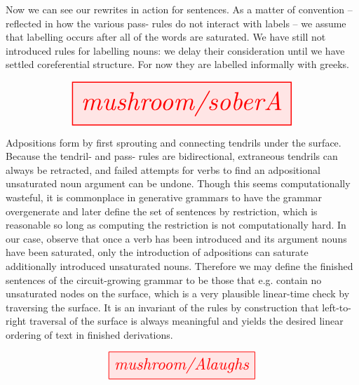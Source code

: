 \begin{myboxR}
\begin{example}\label{ex:soberA}
Now we can see our rewrites in action for sentences. As a matter of convention -- reflected in how the various pass- rules do not interact with labels -- we assume that labelling occurs after all of the words are saturated. We have still not introduced rules for labelling nouns: we delay their consideration until we have settled coreferential structure. For now they are labelled informally with greeks.
\end{example}
\[
\resizebox{0.75\textwidth}{!}{\tikzfig{mushroom/soberA}}
\]
\end{myboxR}
\clearpage

\begin{myboxR}
\begin{example}\label{ex:Alaughs}
Adpositions form by first sprouting and connecting tendrils under the surface. Because the tendril- and pass- rules are bidirectional, extraneous tendrils can always be retracted, and failed attempts for verbs to find an adpositional unsaturated noun argument can be undone. Though this seems computationally wasteful, it is commonplace in generative grammars to have the grammar overgenerate and later define the set of sentences by restriction, which is reasonable so long as computing the restriction is not computationally hard. In our case, observe that once a verb has been introduced and its argument nouns have been saturated, only the introduction of adpositions can saturate additionally introduced unsaturated nouns. Therefore we may define the finished sentences of the circuit-growing grammar to be those that e.g. contain no unsaturated nodes on the surface, which is a very plausible linear-time check by traversing the surface. It is an invariant of the rules by construction that left-to-right traversal of the surface is always meaningful and yields the desired linear ordering of text in finished derivations.
\end{example}
\[
\resizebox{0.5\textwidth}{!}{\tikzfig{mushroom/Alaughs}}
\]
\end{myboxR}
\clearpage

